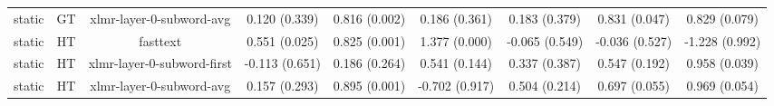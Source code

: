 \begin{sidewaystable}[htb]
\begin{tabular}{@{}ccccccccc@{}}
        static & GT & xlmr-layer-0-subword-avg & 0.120 (0.339) & 0.816 (0.002) & 0.186 (0.361) & 0.183 (0.379) & 0.831 (0.047) & 0.829 (0.079) \\
        static & HT & fasttext & 0.551 (0.025) & 0.825 (0.001) & 1.377 (0.000) & -0.065 (0.549) & -0.036 (0.527) & -1.228 (0.992) \\
        static & HT & xlmr-layer-0-subword-first & -0.113 (0.651) & 0.186 (0.264) & 0.541 (0.144) & 0.337 (0.387) & 0.547 (0.192) & 0.958 (0.039) \\
        static & HT & xlmr-layer-0-subword-avg & 0.157 (0.293) & 0.895 (0.001) & -0.702 (0.917) & 0.504 (0.214) & 0.697 (0.055) & 0.969 (0.054) \\
        \bottomrule
    \end{tabular}
\end{sidewaystable}